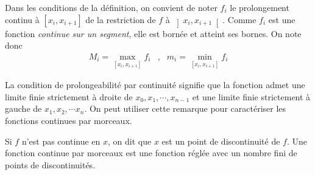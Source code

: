 \begin{nota}
 Dans les conditions de la définition, on convient de noter $f_i$ le prolongement continu à $\left[ x_i,x_{i+1}\right] $ de la restriction de $f$ à $\left] x_i,x_{i+1}\right[ $. Comme $f_i$ est une fonction \emph{continue sur un segment}, elle est bornée et atteint ses bornes. On note donc
\begin{align*}
 M_i = \max_{[x_i,x_{i+1}]}f_i &,& m_i = \min_{[x_i,x_{i+1}]}f_i
\end{align*}
\end{nota}

\begin{rem}
  La condition de prolongeabilité par continuité signifie que la fonction admet une limite finie strictement à droite de $x_0, x_1, \cdots ,x_{n-1}$ et une limite finie strictement à gauche de $x_1, x_2, \cdots x_n$. On peut utiliser cette remarque pour caractériser les fonctions continues par morceaux.
\end{rem}
\begin{rem}
 Si $f$ n'est pas continue en $x$, on dit que $x$ est un point de discontinuité de $f$. Une fonction continue par morceaux est une fonction réglée avec un nombre fini de points de discontinuités.
\end{rem}


